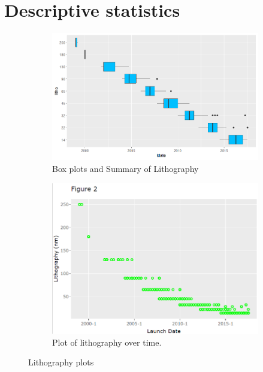 %
%   
\section{Descriptive statistics}
\label{section:discriptive_stats}

\begin{figure}[H]
    \centering
    \begin{subfigure}[b]{0.49\textwidth}
        \includegraphics[width=\textwidth]{graphics/boxplot_litho_ldate.png}
        \caption{Box plots and Summary of Lithography}
        \label{fig:box_litho}
    \end{subfigure}
    \hfill
    \begin{subfigure}[b]{0.49\textwidth}
        \includegraphics[width=\textwidth]{graphics/new_graphics/Fig2.png}
        \caption{Plot of lithography over time.}
        \label{fig:scatter_litho}
    \end{subfigure}
    \caption{Lithography plots}
    \label{litho-ldate}
\end{figure}

